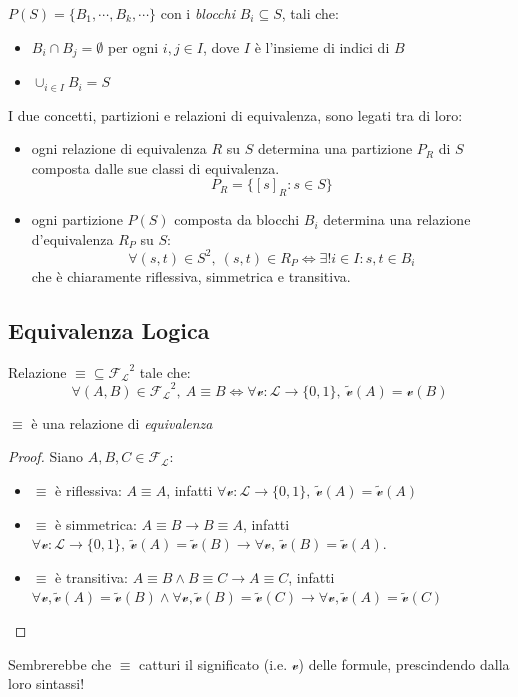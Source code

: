 \begin{defi}[Partizione] 
  $P(S) = \{B_1, \cdots, B_k, \cdots\}$ con i \textit{blocchi} $B_i \subseteq S$, tali che:
  \begin{itemize}
    \item $B_i \cap B_j = \emptyset$ per ogni $i,j \in I$, dove $I$ è l'insieme di indici di $B$
    \item $\cup_{i \in I} B_i = S$
  \end{itemize}
\end{defi}
\noindent
I due concetti, partizioni e relazioni di equivalenza, sono legati tra di loro:
\begin{itemize}
  \item ogni relazione di equivalenza $R$ su $S$ determina una partizione $P_R$ di $S$ composta dalle sue classi di equivalenza.
    $$
      P_R = \{[s]_R : s \in S\}
    $$
  \item ogni partizione $P(S)$ composta da blocchi $B_i$ determina una relazione d'equivalenza $R_P$ su $S$: 
    $$
      \forall (s,t) \in S^2,\ (s,t) \in R_P \iff \exists! i \in I : s,t \in B_i
    $$
che è chiaramente riflessiva, simmetrica e transitiva. 
\end{itemize}

\subsection{Equivalenza Logica}
\begin{defi}
\label{def:equivalenza}
  Relazione $\equiv \subseteq \mathscr{F_L}^2$ tale che:
  $$
    \forall (A,B) \in \mathscr{F_L}^2,\ A \equiv B \iff \forall \mathcal{v}:\mathscr{L}\rightarrow \{0,1\},\ \widetilde{\mathcal{v}}(A) = \mathcal{v}(B)
  $$
\end{defi}
\begin{oss}
  $\equiv$ è una relazione di \textit{equivalenza}
\end{oss}
\begin{proof}
Siano $A, B, C \in \mathscr{F_L}$:
  \begin{itemize}
    \item $\equiv$ è riflessiva: $A \equiv A$, infatti $\forall \mathcal{v} : \mathscr{L} \rightarrow \{0,1\},\ \widetilde{\mathcal{v}}(A) = \widetilde{\mathcal{v}}(A)$
    \item $\equiv$ è simmetrica: $A \equiv B \rightarrow B \equiv A$, infatti $\forall \mathcal{v}:\mathscr{L} \rightarrow \{0,1\},\ \widetilde{\mathcal{v}}(A) = \widetilde{\mathcal{v}}(B) \rightarrow \forall \mathcal{v},\  \widetilde{\mathcal{v}}(B) = \widetilde{\mathcal{v}}(A)$. 
    \item $\equiv$ è transitiva: $A \equiv B \land B \equiv C \rightarrow A \equiv C$, infatti $\forall \mathcal{v}, \widetilde{\mathcal{v}}(A) = \widetilde{\mathcal{v}}(B) \land \forall \mathcal{v}, \widetilde{\mathcal{v}}(B) = \widetilde{\mathcal{v}}(C) \rightarrow \forall \mathcal{v}, \widetilde{\mathcal{v}}(A) = \widetilde{\mathcal{v}}(C)$ 
  \end{itemize}
\end{proof} 
\noindent
Sembrerebbe che $\equiv$ catturi il significato (i.e. $\mathcal{v}$) delle formule, prescindendo dalla loro sintassi!


